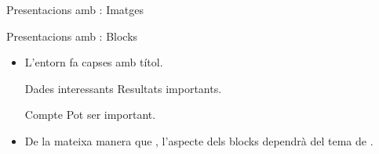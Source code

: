 \begin{frame}[fragile]{Presentacions amb \protect{}: Imatges}

\end{frame}

\begin{frame}[fragile]{Presentacions amb \protect{}: Blocks}
\begin{itemize}
\item L'entorn  fa capses amb títol. 
\begin{exampletwouptiny}
\begin{block}{Dades interessants}
Resultats importants.
\end{block}

\begin{alertblock}{Compte}
    Pot ser important.
\end{alertblock}
\end{exampletwouptiny}

\item De la mateixa manera que , l'aspecte dels blocks dependrà del tema de .
\end{itemize}
\end{frame}

